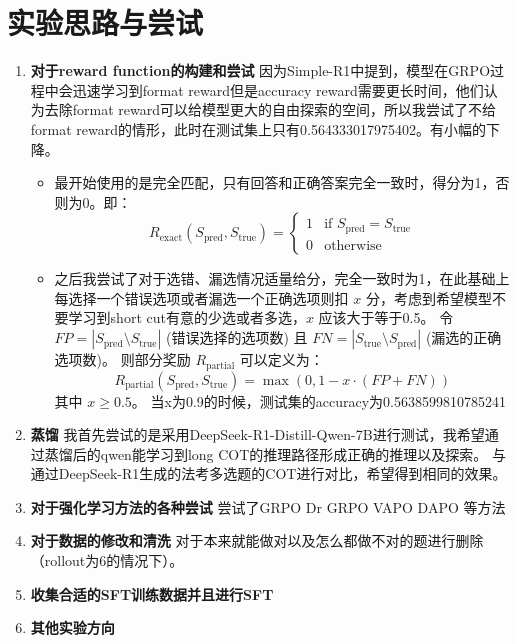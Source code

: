 \documentclass{pkuthesis}
\begin{document}
\section{实验思路与尝试}
\begin{enumerate}[label=\arabic*.]
    \item \textbf{对于reward function的构建和尝试}
    因为Simple-R1中提到，模型在GRPO过程中会迅速学习到format reward但是accuracy reward需要更长时间，他们认为去除format reward可以给模型更大的自由探索的空间，所以我尝试了不给format reward的情形，此时在测试集上只有0.564333017975402。有小幅的下降。
    \begin{itemize}
        \item 最开始使用的是完全匹配，只有回答和正确答案完全一致时，得分为1，否则为0。即：
        $$ R_{\text{exact}}(S_{\text{pred}}, S_{\text{true}}) = \begin{cases} 1 & \text{if } S_{\text{pred}} = S_{\text{true}} \\ 0 & \text{otherwise} \end{cases} $$
        \item 之后我尝试了对于选错、漏选情况适量给分，完全一致时为1，在此基础上每选择一个错误选项或者漏选一个正确选项则扣 $x$ 分，考虑到希望模型不要学习到short cut有意的少选或者多选，$x$ 应该大于等于0.5。
        令 $FP = |S_{\text{pred}} \setminus S_{\text{true}}|$ (错误选择的选项数) 且 $FN = |S_{\text{true}} \setminus S_{\text{pred}}|$ (漏选的正确选项数)。
        则部分奖励 $R_{\text{partial}}$ 可以定义为：
        $$ R_{\text{partial}}(S_{\text{pred}}, S_{\text{true}}) = \max(0, 1 - x \cdot (FP + FN)) $$
        其中 $x \ge 0.5$。
        当x为0.9的时候，测试集的accuracy为0.5638599810785241    
    \end{itemize}
    \item \textbf{蒸馏}
    我首先尝试的是采用DeepSeek-R1-Distill-Qwen-7B进行测试，我希望通过蒸馏后的qwen能学习到long COT的推理路径形成正确的推理以及探索。
    与通过DeepSeek-R1生成的法考多选题的COT进行对比，希望得到相同的效果。
    \item \textbf{对于强化学习方法的各种尝试}
尝试了GRPO Dr GRPO VAPO DAPO 等方法
    \item \textbf{对于数据的修改和清洗}
    对于本来就能做对以及怎么都做不对的题进行删除（rollout为6的情况下）。
    \item \textbf{收集合适的SFT训练数据并且进行SFT}
    \item \textbf{其他实验方向}
    \begin{enumerate}[label=\arabic*.]


\end{enumerate}
\end{enumerate}
\end{document}
